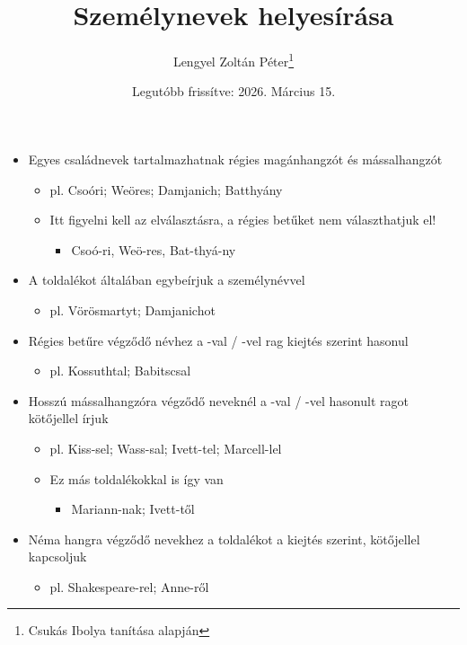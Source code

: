 \documentclass{article}
\title{Személynevek helyesírása}
\author{Lengyel Zoltán Péter\thanks{Csukás Ibolya tanítása alapján}}
\date{Legutóbb frissítve: 2026. Március 15.}
\begin{document}
\maketitle
\tableofcontents
\newpage

\begin{itemize}
    \item Egyes családnevek tartalmazhatnak régies magánhangzót és mássalhangzót
    \begin{itemize}
        \item pl. Csoóri; Weöres; Damjanich; Batthyány
        \item Itt figyelni kell az elválasztásra, a régies betűket nem választhatjuk el!
        \begin{itemize}
            \item Csoó-ri, Weö-res, Bat-thyá-ny
        \end{itemize} 
    \end{itemize}
    \item A toldalékot általában egybeírjuk a személynévvel
    \begin{itemize}
        \item pl. Vörösmartyt; Damjanichot
    \end{itemize}
    \item Régies betűre végződő névhez a -val / -vel rag kiejtés szerint hasonul
    \begin{itemize}
        \item pl. Kossuthtal; Babitscsal
    \end{itemize}
    \item Hosszú mássalhangzóra végződő neveknél a -val / -vel hasonult ragot kötőjellel írjuk
    \begin{itemize}
        \item pl. Kiss-sel; Wass-sal; Ivett-tel; Marcell-lel
        \item Ez más toldalékokkal is így van
        \begin{itemize}
            \item Mariann-nak; Ivett-től
        \end{itemize}
    \end{itemize}
    \item Néma hangra végződő nevekhez a toldalékot a kiejtés szerint, kötőjellel kapcsoljuk
    \begin{itemize}
        \item pl. Shakespeare-rel; Anne-ről
    \end{itemize}


\end{itemize}
\end{document}
